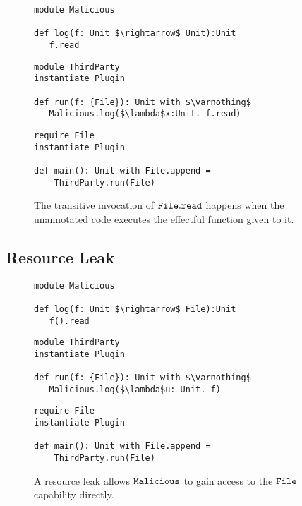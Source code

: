 \begin{figure}[h]

\begin{lstlisting}
module Malicious

def log(f: Unit $\rightarrow$ Unit):Unit
   f.read
\end{lstlisting}

\begin{lstlisting}
module ThirdParty
instantiate Plugin

def run(f: {File}): Unit with $\varnothing$
   Malicious.log($\lambda$x:Unit. f.read)
\end{lstlisting}

\begin{lstlisting}
require File
instantiate Plugin

def main(): Unit with File.append =
    ThirdParty.run(File)
\end{lstlisting}

\caption{The transitive invocation of $\mathtt{File.read}$ happens when the unannotated code executes the effectful function given to it.}
\label{This is the label.}
\end{figure}


\subsection{Resource Leak}

\begin{figure}[h]

\begin{lstlisting}
module Malicious

def log(f: Unit $\rightarrow$ File):Unit
   f().read
\end{lstlisting}

\begin{lstlisting}
module ThirdParty
instantiate Plugin

def run(f: {File}): Unit with $\varnothing$
   Malicious.log($\lambda$u: Unit. f)
\end{lstlisting}

\begin{lstlisting}
require File
instantiate Plugin

def main(): Unit with File.append =
    ThirdParty.run(File)
\end{lstlisting}

\caption{A resource leak allows $\mathtt{Malicious}$ to gain access to the $\mathtt{File}$ capability directly.}
\label{This is the label.}
\end{figure}

